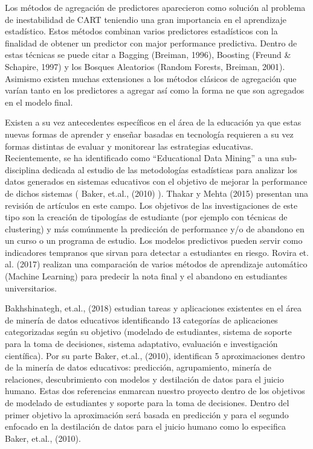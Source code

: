 \documentclass[msc,oneside,a4paper]{udelar}\usepackage[]{graphicx}\usepackage[]{color}
\begin{document}
Los métodos de agregación de predictores aparecieron como solución al problema de inestabilidad de CART teniendio una gran importancia en el aprendizaje estadístico. Estos métodos combinan varios predictores estadísticos con la finalidad de obtener un predictor con major performance predictiva. Dentro de estas técnicas se puede citar a Bagging (Breiman, 1996), Boosting (Freund \& Schapire, 1997) y los Bosques Aleatorios (Random Forests, Breiman, 2001). Asimismo existen muchas extensiones a los métodos clásicos de agregación que varían tanto en los predictores a agregar así como la forma ne que son agregados en el modelo final.

Existen a su vez antecedentes específicos en el área de la educación ya que estas nuevas formas de aprender y enseñar basadas en tecnología requieren a su vez formas distintas de evaluar y monitorear las estrategias educativas. Recientemente, se ha identificado como “Educational Data Mining” a una sub-disciplina dedicada al estudio de las metodologías estadísticas para analizar los datos generados en sistemas educativos con el objetivo de mejorar la performance de dichos sistemas ( Baker, et.al., (2010) ). Thakar y Mehta (2015) presentan una revisión de artículos en este campo. Los objetivos de las investigaciones de este tipo son la creación de tipologías de estudiante (por ejemplo con técnicas de clustering) y más comúnmente la predicción de performance y/o de abandono en un curso o un programa de estudio. Los modelos predictivos pueden servir como indicadores tempranos que sirvan para detectar a estudiantes en riesgo. Rovira et. al. (2017) realizan una comparación de varios métodos de aprendizaje automático (Machine Learning) para predecir la nota final y el abandono en estudiantes universitarios.

Bakhshinategh, et.al., (2018) estudian tareas y aplicaciones existentes en el área de minería de datos educativos identificando 13 categorías de aplicaciones categorizadas según su objetivo (modelado de estudiantes, sistema de soporte para la toma de decisiones, sistema adaptativo, evaluación e investigación científica). Por su parte Baker, et.al., (2010), identifican 5 aproximaciones dentro de la minería de datos educativos: predicción, agrupamiento, minería de relaciones, descubrimiento con modelos y destilación de datos para el juicio humano. Estas dos referencias enmarcan nuestro proyecto dentro de los objetivos de modelado de estudiantes y soporte para la toma de decisiones. Dentro del primer objetivo la aproximación será basada en predicción y para el segundo enfocado en la destilación de datos para el juicio humano como lo especifica Baker, et.al., (2010).
\end{document}
